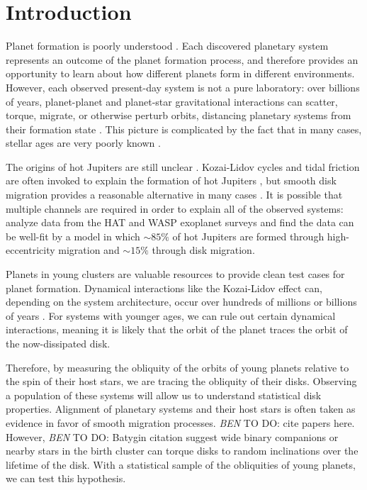 \documentclass[twocolumn]{aastex63}
\newcommand{\todo}[3]{{\color{#2} \emph{#1} TO DO: #3}}
\newcommand{\btmtodo}[1]{\todo{BEN}{blue}{#1}}
\begin{document}


 
\section{Introduction} \label{sec:intro}

Planet formation is poorly understood \citep[e.g.][]{Morbidelli16}. 
Each discovered planetary system represents an outcome of the planet formation process, and therefore provides an opportunity to learn about how different planets form in different environments. 
However, each observed present-day system is not a pure laboratory: over billions of years, planet-planet and planet-star gravitational interactions can scatter, torque, migrate, or otherwise perturb orbits, distancing planetary systems from their formation state \citep{Kozai62, Lidov62, Fabrycky07, Chatterjee08}. 
This picture is complicated by the fact that in many cases, stellar ages are very poorly known \citep[e.g.][]{Barnes07, Soderblom10}.

The origins of hot Jupiters are still unclear \citep{Dawson18}.
Kozai-Lidov cycles and tidal friction are often invoked to explain the formation of hot Jupiters \citep{Fabrycky07}, but smooth disk migration provides a reasonable alternative in many cases \citep{Ida08}. 
It is possible that multiple channels are required in order to explain all of the observed systems: \citet{Nelson17} analyze data from the HAT and WASP exoplanet surveys and find the data can be well-fit by a model in which $\sim85\%$ of hot Jupiters are formed through high-eccentricity migration and $\sim15\%$ through disk migration.

Planets in young clusters are valuable resources to provide clean test cases for planet formation. 
Dynamical interactions like the Kozai-Lidov effect can, depending on the system architecture, occur over hundreds of millions or billions of years \citep{Montet15c, Naoz16}. 
For systems with younger ages, we can rule out certain dynamical interactions, meaning it is likely that the orbit of the planet traces the orbit of the now-dissipated disk. 

Therefore, by measuring the obliquity of the orbits of young planets relative to the spin of their host stars, we are tracing the obliquity of their disks. 
Observing a population of these systems will allow us to understand statistical disk properties. 
Alignment of planetary systems and their host stars is often taken as evidence in favor of smooth migration processes. \btmtodo{cite papers here}. 
However, \btmtodo{Batygin citation} suggest wide binary companions or nearby stars in the birth cluster can torque disks to random inclinations over the lifetime of the disk. With a statistical sample of the obliquities of young planets, we can test this hypothesis.
\end{document}
